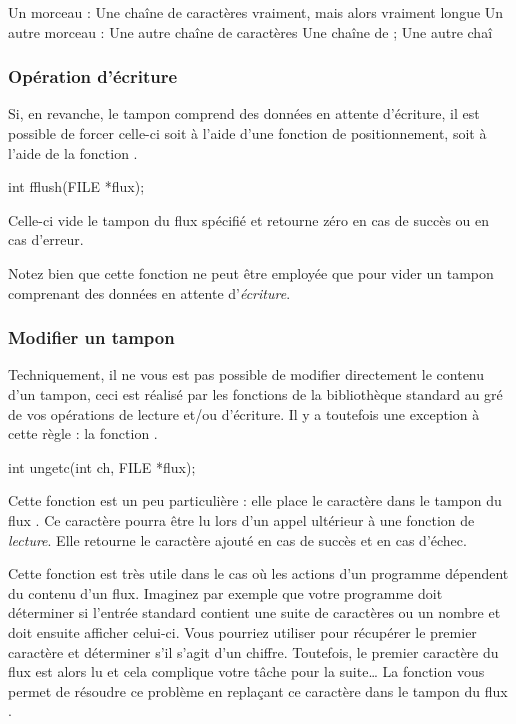 \begin{C}
Un morceau : Une chaîne de caractères vraiment, mais alors vraiment longue
Un autre morceau : Une autre chaîne de caractères
Une chaîne de  ; Une autre chaî
\end{C}

\subsubsection{Opération d'écriture}
\label{operation-decriture}

Si, en revanche, le tampon comprend des données en attente d'écriture,
il est possible de forcer celle-ci soit à l'aide d'une fonction de
positionnement, soit à l'aide de la fonction .

\begin{C}
int fflush(FILE *flux);
\end{C}

Celle-ci vide le tampon du flux spécifié et retourne zéro en cas de
succès ou  en cas d'erreur.

\begin{attentionbox}
  Notez bien que cette fonction ne peut
être employée que pour vider un tampon comprenant des données en attente
d'\emph{écriture}.
\end{attentionbox}


\subsubsection{Modifier un tampon}
\label{modifier-un-tampon}

Techniquement, il ne vous est pas possible de modifier directement le
contenu d'un tampon, ceci est réalisé par les fonctions de la
bibliothèque standard au gré de vos opérations de lecture et/ou
d'écriture. Il y a toutefois une exception à cette règle : la fonction
.

\begin{C}
int ungetc(int ch, FILE *flux);
\end{C}

Cette fonction est un peu particulière : elle place le caractère
 dans le tampon du flux . Ce caractère pourra
être lu lors d'un appel ultérieur à une fonction de \emph{lecture}. Elle
retourne le caractère ajouté en cas de succès et  en cas
d'échec.

Cette fonction est très utile dans le cas où les actions d'un programme
dépendent du contenu d'un flux. Imaginez par exemple que votre programme
doit déterminer si l'entrée standard contient une suite de caractères ou
un nombre et doit ensuite afficher celui-ci. Vous pourriez utiliser
 pour récupérer le premier caractère et déterminer
s'il s'agit d'un chiffre. Toutefois, le premier caractère du flux est
alors lu et cela complique votre tâche pour la suite\ldots{} La fonction
 vous permet de résoudre ce problème en replaçant ce
caractère dans le tampon du flux .

